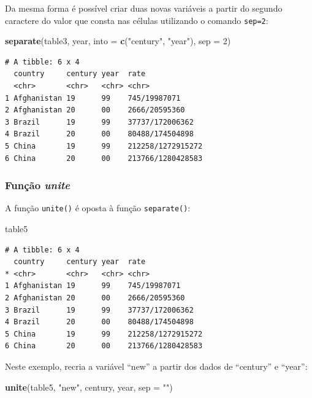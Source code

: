 \documentclass[12pt,brazil,oneside]{book}
\newenvironment{Shaded}{\begin{snugshade}}{\end{snugshade}}
\newcommand{\DataTypeTok}[1]{\textcolor[rgb]{0.13,0.29,0.53}{#1}}
\newcommand{\DecValTok}[1]{\textcolor[rgb]{0.00,0.00,0.81}{#1}}
\newcommand{\KeywordTok}[1]{\textcolor[rgb]{0.13,0.29,0.53}{\textbf{#1}}}
\newcommand{\NormalTok}[1]{#1}
\newcommand{\StringTok}[1]{\textcolor[rgb]{0.31,0.60,0.02}{#1}}
\begin{document}
Da mesma forma é possível criar duas novas variáveis a partir do segundo caractere do valor que consta nas células utilizando o comando \texttt{sep=2}:

\begin{Shaded}
\begin{Highlighting}[]
\KeywordTok{separate}\NormalTok{(table3, year, }\DataTypeTok{into =} \KeywordTok{c}\NormalTok{(}\StringTok{"century"}\NormalTok{, }\StringTok{"year"}\NormalTok{), }\DataTypeTok{sep =} \DecValTok{2}\NormalTok{)}
\end{Highlighting}
\end{Shaded}

\begin{verbatim}
# A tibble: 6 x 4
  country     century year  rate             
  <chr>       <chr>   <chr> <chr>            
1 Afghanistan 19      99    745/19987071     
2 Afghanistan 20      00    2666/20595360    
3 Brazil      19      99    37737/172006362  
4 Brazil      20      00    80488/174504898  
5 China       19      99    212258/1272915272
6 China       20      00    213766/1280428583
\end{verbatim}

\hypertarget{funcao-unite}{%
\subsubsection{\texorpdfstring{Função \emph{unite}}{Função unite}}\label{funcao-unite}}

A função \texttt{unite()} é oposta à função \texttt{separate()}:

\begin{Shaded}
\begin{Highlighting}[]
\NormalTok{table5}
\end{Highlighting}
\end{Shaded}

\begin{verbatim}
# A tibble: 6 x 4
  country     century year  rate             
* <chr>       <chr>   <chr> <chr>            
1 Afghanistan 19      99    745/19987071     
2 Afghanistan 20      00    2666/20595360    
3 Brazil      19      99    37737/172006362  
4 Brazil      20      00    80488/174504898  
5 China       19      99    212258/1272915272
6 China       20      00    213766/1280428583
\end{verbatim}

Neste exemplo, recria a variável ``new'' a partir dos dados de ``century'' e ``year'':

\begin{Shaded}
\begin{Highlighting}[]
\KeywordTok{unite}\NormalTok{(table5, }\StringTok{"new"}\NormalTok{, century, year, }\DataTypeTok{sep =} \StringTok{""}\NormalTok{)}
\end{Highlighting}
\end{Shaded}
\end{document}
